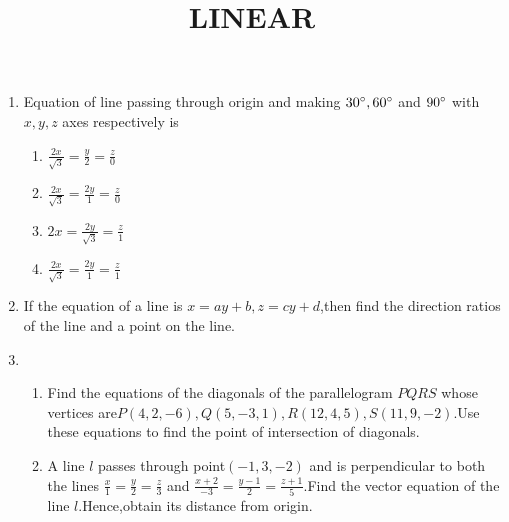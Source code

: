 \documentclass[12pt,A4 paper]{article}
\begin{document}
\title{\textbf{LINEAR}}
\date{}
\maketitle
\begin{enumerate}
    \item Equation of line passing through origin and making $30\degree,60\degree$ and $90\degree$ with $x,y,z$ axes respectively is
    \begin{enumerate}
        \item $\frac{2x}{\sqrt3}=\frac{y}{2}=\frac{z}{0}$
        \item $\frac{2x}{\sqrt3}=\frac{2y}{1}=\frac{z}{0}$
        \item $2x=\frac{2y}{\sqrt3}=\frac{z}{1}$
        \item $\frac{2x}{\sqrt3}=\frac{2y}{1}=\frac{z}{1}$
    \end{enumerate}
    \item If the equation of a line is $x=ay+b,z=cy+d$,then find the direction ratios of the line and a point on the line.
    \item
    \begin{enumerate}
        \item Find the equations of the diagonals of the parallelogram $PQRS$ whose vertices are$P(4,2,-6),Q(5,-3,1),R(12,4,5),S(11,9,-2)$.Use these equations to find the point of intersection of diagonals.  
        \item A line $l$ passes through point$(-1,3,-2)$ and is perpendicular to both the lines $\frac{x}{1}=\frac{y}{2}=\frac{z}{3}$ and $\frac{x+2}{-3}=\frac{y-1}{2}=\frac{z+1}{5}$.Find the vector equation of the line $l$.Hence,obtain its distance from origin.
    \end{enumerate}
   
   
   
\end{enumerate}
\end{document}
